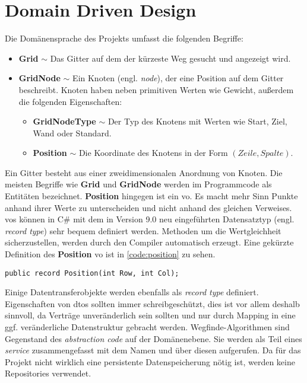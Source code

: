 \part{Domain Driven Design}
Die Domänensprache des Projekts umfasst die folgenden Begriffe:
\begin{itemize}
      \item \textbf{Grid} $\sim$ Das Gitter auf dem der kürzeste Weg gesucht und
            angezeigt wird.
      \item \textbf{GridNode} $\sim$ Ein Knoten (engl. \textit{node}),
            der eine Position auf dem Gitter beschreibt. Knoten haben neben
            primitiven Werten wie Gewicht, außerdem die
            folgenden Eigenschaften:
            \begin{itemize}[topsep=0pt]
                  \item \textbf{GridNodeType} $\sim$ Der Typ des Knotens mit Werten
                        wie Start, Ziel, Wand oder Standard.
                  \item \textbf{Position} $\sim$ Die Koordinate des Knotens in der
                        Form $(Zeile,Spalte)$.
            \end{itemize}
\end{itemize}
Ein Gitter besteht aus einer zweidimensionalen Anordnung von Knoten.
Die meisten Begriffe wie \textbf{Grid} und \textbf{GridNode} werden
im Programmcode als Entitäten bezeichnet.
\textbf{Position} hingegen ist ein \ac{vo}. Es macht mehr Sinn Punkte anhand ihrer
Werte zu unterscheiden und nicht anhand des gleichen Verweises.
\acp{vo} können in C\# mit dem in Version 9.0 neu eingeführten
Datensatztyp (engl. \textit{record type}) sehr bequem definiert werden.
Methoden um die Wertgleichheit sicherzustellen,
werden durch den Compiler automatisch erzeugt.
Eine gekürzte Definition des \textbf{Position} \ac{vo} ist in \autoref{code:position}
zu sehen.
\begin{lstlisting}[caption={Der Datensatztyp einer Koordinate},label={code:position}]
public record Position(int Row, int Col);
\end{lstlisting}
Einige Datentransferobjekte werden ebenfalls als \textit{record type} definiert.
Eigenschaften von \acp{dto} sollten immer schreibgeschützt,
dies ist vor allem deshalb sinnvoll, da Verträge un\-veränderlich sein sollten
und nur durch Mapping in eine ggf. veränderliche Datenstruktur gebracht werden.
Wegfinde-Algorithmen sind Gegenstand des \textit{abstraction code} auf
der Domänenebene. Sie werden als Teil eines \textit{service}
zusammengefasst mit dem Namen  und
über diesen aufgerufen. Da für das Projekt nicht wirklich
eine persistente Datenspeicherung nötig ist, werden keine
Repositories verwendet.
